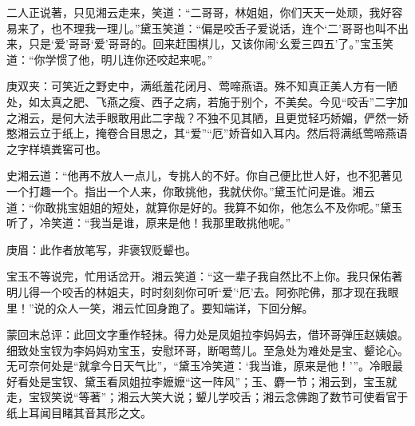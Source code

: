 \begin{parag}
    二人正说著，只见湘云走来，笑道：“二哥哥，林姐姐，你们天天一处顽，我好容易来了，也不理我一理儿。”黛玉笑道：“偏是咬舌子爱说话，连个‘二’哥哥也叫不出来，只是‘爱’哥哥‘爱’哥哥的。回来赶围棋儿，又该你闹‘幺爱三四五’了。”宝玉笑道：“你学惯了他，明儿连你还咬起来呢。”\begin{note}庚双夹：可笑近之野史中，满纸羞花闭月、莺啼燕语。殊不知真正美人方有一陋处，如太真之肥、飞燕之瘦、西子之病，若施于别个，不美矣。今见“咬舌”二字加之湘云，是何大法手眼敢用此二字哉？不独不见其陋，且更觉轻巧娇媚，俨然一娇憨湘云立于纸上，掩卷合目思之，其“爱”“厄”娇音如入耳内。然后将满纸莺啼燕语之字样填粪窖可也。\end{note}史湘云道：“他再不放人一点儿，专挑人的不好。你自己便比世人好，也不犯著见一个打趣一个。指出一个人来，你敢挑他，我就伏你。”黛玉忙问是谁。湘云道：“你敢挑宝姐姐的短处，就算你是好的。我算不如你，他怎么不及你呢。”黛玉听了，冷笑道：“我当是谁，原来是他！我那里敢挑他呢。”\begin{note}庚眉：此作者放笔写，非褒钗贬颦也。\end{note}宝玉不等说完，忙用话岔开。湘云笑道：“这一辈子我自然比不上你。我只保佑著明儿得一个咬舌的林姐夫，时时刻刻你可听‘爱’‘厄’去。阿弥陀佛，那才现在我眼里！”说的众人一笑，湘云忙回身跑了。要知端详，下回分解。
\end{parag}


\begin{parag}
    \begin{note}蒙回末总评：此回文字重作轻抹。得力处是凤姐拉李妈妈去，借环哥弹压赵姨娘。细致处宝钗为李妈妈劝宝玉，安慰环哥，断喝莺儿。至急处为难处是宝、颦论心。无可奈何处是“就拿今日天气比”，“黛玉冷笑道：‘我当谁，原来是他！’”。冷眼最好看处是宝钗、黛玉看凤姐拉李嬷嬷“这一阵风”；玉、麝一节；湘云到，宝玉就走，宝钗笑说“等著”；湘云大笑大说；颦儿学咬舌；湘云念佛跑了数节可使看官于纸上耳闻目睹其音其形之文。\end{note}
\end{parag}